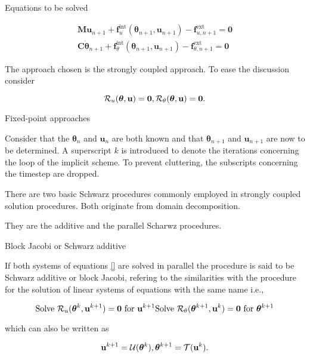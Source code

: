  Equations to be solved

$$
\begin{array}{l}\mathbf{M u}_{n+1}+\mathbf{f}_{u}^{\mathrm{int}}\left(\boldsymbol{\theta}_{n+1}, \mathbf{u}_{n+1}\right)-\mathbf{f}_{u, n+1}^{\mathrm{ext}}=\mathbf{0} \\[6pt]\mathbf{C} \dot{\boldsymbol \theta}_{n+1}+\mathbf{f}_{\theta}^{\mathrm{int}}\left(\boldsymbol{\theta}_{n+1}, \mathbf{u}_{n+1}\right)-\mathbf{f}_{\theta, n+1}^{\mathrm{ext}}=\mathbf{0}\end{array}
$$

The approach chosen is the strongly coupled approach. To ease the discussion consider

$$
\mathcal R_u(\boldsymbol \theta, \mathbf u) = \mathbf 0,\\
\mathcal R_\theta(\boldsymbol \theta, \mathbf u) = \mathbf 0.
$$

 Fixed-point approaches

Consider that the $\boldsymbol \theta_n$ and $\mathbf u_n$ are both known and that $\boldsymbol \theta_{n+1}$ and $\mathbf u_{n+1}$ are now to be determined. A superscript $k$ is introduced to denote the iterations concerning the loop of the implicit scheme. To prevent cluttering, the subscripts concerning the timestep are dropped.

There are two basic Schwarz procedures commonly employed in strongly coupled solution procedures. Both originate from domain decomposition.

They are the additive and the parallel Scharwz procedures.

 Block Jacobi or Schwarz additive

If both systems of equations \eqref{} are solved in parallel the procedure is said to be Schwarz additive or block Jacobi, refering to the similarities with the procedure for the solution of linear systems of equations with the same name i.e.,

$$
\text{Solve }\mathcal R_u(\boldsymbol \theta^{k},\mathbf u^{k+1}) = \mathbf 0\text{ for \(\mathbf u^{k+1}\)}\\
\text{Solve }\mathcal R_\theta(\boldsymbol \theta^{k+1}, \mathbf u^k) = \mathbf 0\text{ for \(\boldsymbol \theta^{k+1}\)}
$$

which can also be written as

$$
\mathbf u^{k+1} = \mathcal U(\boldsymbol \theta^k),\\
\boldsymbol \theta^{k+1} = \mathcal T(\mathbf u^k).
$$

